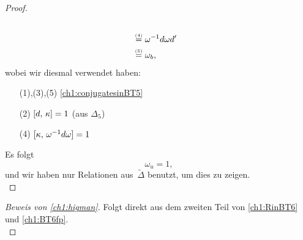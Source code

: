\begin{proof}
\begin{align*}
        \\
        &\overset{\scriptscriptstyle(4)}=
        \omega^{-1} d\omega d'
        \\
        &\overset{\scriptscriptstyle(5)}=
        \omega_b
    , \end{align*}
    wobei wir diesmal verwendet haben:
    \begin{enumerate}[leftmargin=2.155cm, itemsep=0pt, topsep=0.5\baselineskip]
        \item[(1),(3),(5)]
            \cref{ch1:conjugatesinBT5}
        \item[(2)]
            $\cu[d, \kappa] = 1$ (aus $\Delta_5$)
        \item[(4)]
            $\cu[\kappa, \omega\inv d\omega] = 1$
    \end{enumerate}
    Es folgt
    \[ \omega_u = 1  , \]
    und wir haben nur Relationen aus~$\widetilde\Delta$ benutzt, um dies
    zu zeigen.
    \\
\end{proof}

\begin{proof}[Beweis von \cref{ch1:higman}]
    Folgt direkt aus dem zweiten Teil von \cref{ch1:RinBT6}
    und \cref{ch1:BT6fp}.
    \\
\end{proof}
